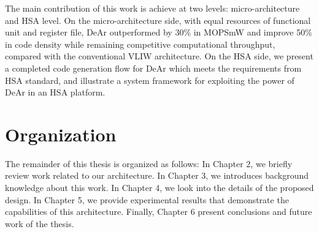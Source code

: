         The main contribution of this work is achieve at two levels: micro-architecture and HSA level. 
        On the micro-architecture side, with equal resources of functional unit and register file, DeAr outperformed by 30\% in MOPS\/mW and improve 50\% in code density while remaining competitive computational throughput, compared with the conventional VLIW architecture.
        On the HSA side, we present a completed code generation flow for DeAr which meets the requirements from HSA standard, and illustrate a system framework for exploiting the power of DeAr in an HSA platform.
 
    \section{Organization}
        The remainder of this thesis is organized as follows: In Chapter 2, we briefly review work related to our architecture. In Chapter 3, we introduces background knowledge about this work. In Chapter 4, we look into the details of the proposed design. In Chapter 5, we provide experimental results that demonstrate the capabilities of this architecture. Finally, Chapter 6 present conclusions and future work of the thesis.


